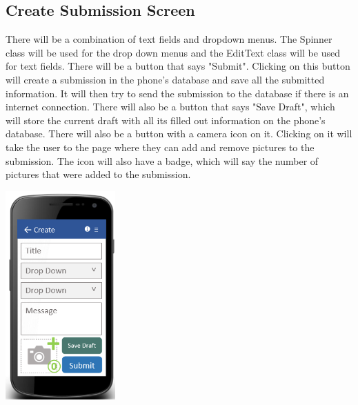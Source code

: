 \documentclass[onecolumn, draftclsnofoot,10pt, compsoc]{IEEEtran}
\begin{document}
\subsection{Create Submission Screen}
There will be a combination of text fields and dropdown menus. The Spinner class will be used for the drop down menus and the EditText class will be used for text fields. There will be a button that says "Submit". Clicking on this button will create a submission in the phone's database and save all the submitted information. It will then try to send the submission to the database if there is an internet connection. There will also be a button that says "Save Draft", which will store the current draft with all its filled out information on the phone's database. There will also be a button with a camera icon on it. Clicking on it will take the user to the page where they can add and remove pictures to the submission. The icon will also have a badge, which will say the number of pictures that were added to the submission.
\newline
\begin{center}
\includegraphics[height=8cm]{createscreen.png}
\end{center}
\end{document}
